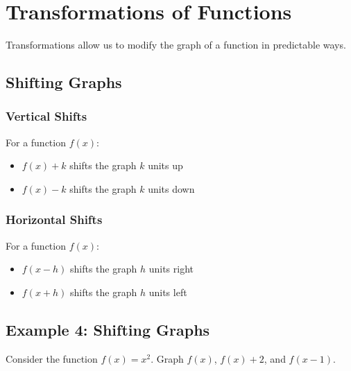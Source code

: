 \documentclass[12pt]{article}
\begin{document}
\section{Transformations of Functions}

Transformations allow us to modify the graph of a function in predictable ways.

\subsection{Shifting Graphs}

\subsubsection{Vertical Shifts}

For a function $f(x)$:
\begin{itemize}
    \item $f(x) + k$ shifts the graph $k$ units up
    \item $f(x) - k$ shifts the graph $k$ units down
\end{itemize}

\subsubsection{Horizontal Shifts}

For a function $f(x)$:
\begin{itemize}
    \item $f(x - h)$ shifts the graph $h$ units right
    \item $f(x + h)$ shifts the graph $h$ units left
\end{itemize}

\subsection{Example 4: Shifting Graphs}

Consider the function $f(x) = x^2$. Graph $f(x)$, $f(x) + 2$, and $f(x - 1)$.

\begin{center}
\end{center}
\end{document}
